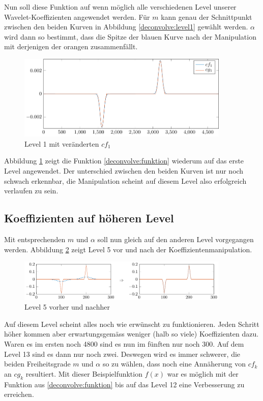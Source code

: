 Nun soll diese Funktion auf wenn möglich alle verschiedenen Level unserer Wavelet-Koeffizienten angewendet werden.
Für $m$ kann genau der Schnittpunkt zwischen den beiden Kurven in Abbildung \ref{deconvolve:level1} gewählt werden.
$\alpha$ wird dann so bestimmt, dass die Spitze der blauen Kurve nach der Manipulation mit derjenigen der orangen zusammenfällt.
\begin{figure}[h]
\centering
\includegraphics[width=0.9\textwidth]{./papers/deconvolve/pictures/level/level1_n.pdf}
\caption{Level 1 mit veränderten $cf_1$\label{deconvolve:level1_n}}
\end{figure}

Abbildung \ref{deconvolve:level1_n} zeigt die Funktion \eqref{deconvolve:funktion} wiederum auf das erste Level angewendet.
Der unterschied zwischen den beiden Kurven ist nur noch schwach erkennbar, die Manipulation scheint auf diesem Level also erfolgreich verlaufen zu sein.

\subsection{Koeffizienten auf höheren Level}

Mit entsprechenden $m$ und $\alpha$ soll nun gleich auf den anderen Level vorgegangen werden.
Abbildung \ref{deconvolve:level5} zeigt Level 5 vor und nach der Koeffizientenmanipulation.
\begin{figure}[h]
\centering
\includegraphics[width=0.9\textwidth]{./papers/deconvolve/pictures/level/level5.pdf}
\caption{Level 5 vorher und nachher\label{deconvolve:level5}}
\end{figure}

Auf diesem Level scheint alles noch wie erwünscht zu funktionieren.
Jeden Schritt höher kommen aber erwartungsgemäss weniger (halb so viele) Koeffizienten dazu.
Waren es im ersten noch 4800 sind es nun im fünften nur noch 300.
Auf dem Level 13 sind es dann nur noch zwei.
Deswegen wird es immer schwerer, die beiden Freiheitsgrade $m$ und $\alpha$ so zu wählen, dass noch eine Annäherung von $cf_k$ an $cg_k$ resultiert.
Mit dieser Beispielfunktion $f(x)$ war es möglich mit der Funktion aus \eqref{deconvolve:funktion} bis auf das Level 12 eine Verbesserung zu erreichen.

